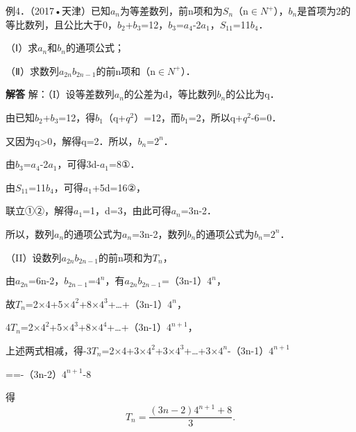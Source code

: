 例4．（2017•天津）已知{\ensuremath{a_{n}}}为等差数列，前n项和为\ensuremath{S_{n}}（n\ensuremath{\in}\ensuremath{N^{+}}），{\ensuremath{b_{n}}}是首项为2的等比数列，且公比大于0，\ensuremath{b_{2}}+\ensuremath{b_{3}}=12，\ensuremath{b_{3}}=\ensuremath{a_{4}}-2\ensuremath{a_{1}}，\ensuremath{S_{11}}=11\ensuremath{b_{4}}．\par
（Ⅰ）求{\ensuremath{a_{n}}}和{\ensuremath{b_{n}}}的通项公式；\par
（Ⅱ）求数列{\ensuremath{a_{2n}}\ensuremath{b_{2n-1}}}的前n项和（n\ensuremath{\in}\ensuremath{N^{+}}）．\par
\QuestionSpace{4.8cm}
\ifshowanswers
\par\begingroup\color{solutioncolor}\noindent\textbf{解答}\quad
解：（I）设等差数列{\ensuremath{a_{n}}}的公差为d，等比数列{\ensuremath{b_{n}}}的公比为q．\par
由已知\ensuremath{b_{2}}+\ensuremath{b_{3}}=12，得\ensuremath{b_{1}}（q+\ensuremath{q^{2}}）=12，而\ensuremath{b_{1}}=2，所以q+\ensuremath{q^{2}}-6=0．\par
又因为q>0，解得q=2．所以，\ensuremath{b_{n}}=\ensuremath{2^{n}}．\par
由\ensuremath{b_{3}}=\ensuremath{a_{4}}-2\ensuremath{a_{1}}，可得3d-\ensuremath{a_{1}}=8①．\par
由\ensuremath{S_{11}}=11\ensuremath{b_{4}}，可得\ensuremath{a_{1}}+5d=16②，\par
联立①②，解得\ensuremath{a_{1}}=1，d=3，由此可得\ensuremath{a_{n}}=3n-2．\par
所以，数列{\ensuremath{a_{n}}}的通项公式为\ensuremath{a_{n}}=3n-2，数列{\ensuremath{b_{n}}}的通项公式为\ensuremath{b_{n}}=\ensuremath{2^{n}}．\par
（II）设数列{\ensuremath{a_{2n}}\ensuremath{b_{2n-1}}}的前n项和为\ensuremath{T_{n}}，\par
由\ensuremath{a_{2n}}=6n-2，\ensuremath{b_{2n-1}}=\ensuremath{4^{n}}，有\ensuremath{a_{2n}}\ensuremath{b_{2n-1}}=（3n-1）\ensuremath{4^{n}}，\par
故\ensuremath{T_{n}}=2\ensuremath{\times}4+5\ensuremath{\times}\ensuremath{4^{2}}+8\ensuremath{\times}\ensuremath{4^{3}}+\ldots{}+（3n-1）\ensuremath{4^{n}}，\par
4\ensuremath{T_{n}}=2\ensuremath{\times}\ensuremath{4^{2}}+5\ensuremath{\times}\ensuremath{4^{3}}+8\ensuremath{\times}\ensuremath{4^{4}}+\ldots{}+（3n-1）\ensuremath{4^{n+1}}，\par
上述两式相减，得-3\ensuremath{T_{n}}=2\ensuremath{\times}4+3\ensuremath{\times}\ensuremath{4^{2}}+3\ensuremath{\times}\ensuremath{4^{3}}+\ldots{}+3\ensuremath{\times}\ensuremath{4^{n}}-（3n-1）\ensuremath{4^{n+1}}\par
==-（3n-2）\ensuremath{4^{n+1}}-8\par
得
\[
\boxed{T_n=\frac{(3n-2)4^{n+1}+8}{3}}.
\]
\par\endgroup\fi

